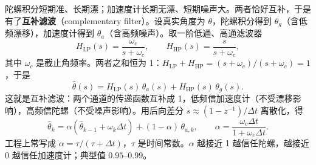 陀螺积分短期准、长期漂；加速度计长期无漂、短期噪声大。两者恰好互补，于是有了\textbf{互补滤波}（complementary filter）。设真实角度为 $\theta$，陀螺积分得到 $\theta_g$（含低频漂移），加速度计得到 $\theta_a$（含高频噪声）。取一阶低通、高通滤波器
\begin{equation}
  H_{\text{LP}}(s)=\frac{\omega_c}{s+\omega_c},
  \qquad
  H_{\text{HP}}(s)=\frac{s}{s+\omega_c},
  \label{eq:06-filters}
\end{equation}
其中 $\omega_c$ 是截止角频率。两者之和恒为 1：$H_{\text{LP}}+H_{\text{HP}}=(s+\omega_c)/(s+\omega_c)=1$，于是
\begin{equation}
  \hat{\theta}(s) = H_{\text{LP}}(s)\,\theta_a(s) + H_{\text{HP}}(s)\,\theta_g(s).
  \label{eq:06-complementary}
\end{equation}
这就是互补滤波：两个通道的传递函数互补成 1，低频信加速度计（不受漂移影响），高频信陀螺（不受噪声影响）。用后向差分 $s\approx(1-z^{-1})/\Delta t$ 离散化，得
\begin{equation}
  \hat{\theta}_k = \alpha\left(\hat{\theta}_{k-1}+\omega_k\Delta t\right) + (1-\alpha)\,\theta_{a,k},
  \qquad
  \alpha = \frac{\omega_c\Delta t}{1+\omega_c\Delta t}.
  \label{eq:06-comp-discrete}
\end{equation}
工程上常写成 $\alpha=\tau/(\tau+\Delta t)$，$\tau$ 是时间常数。$\alpha$ 越接近 1 越信任陀螺，越接近 0 越信任加速度计；典型值 $0.95$--$0.99$。

